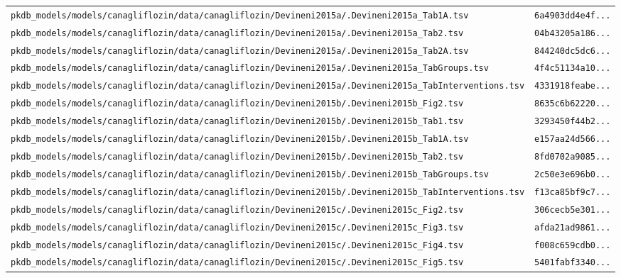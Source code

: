 \documentclass{article}
\begin{document}
\begin{longtable}{ll}
\texttt{pkdb\_models/models/canagliflozin/data/canagliflozin/Devineni2015a/.Devineni2015a\_Tab1A.tsv} & \texttt{6a4903dd4e4f...} \\
\texttt{pkdb\_models/models/canagliflozin/data/canagliflozin/Devineni2015a/.Devineni2015a\_Tab2.tsv} & \texttt{04b43205a186...} \\
\texttt{pkdb\_models/models/canagliflozin/data/canagliflozin/Devineni2015a/.Devineni2015a\_Tab2A.tsv} & \texttt{844240dc5dc6...} \\
\texttt{pkdb\_models/models/canagliflozin/data/canagliflozin/Devineni2015a/.Devineni2015a\_TabGroups.tsv} & \texttt{4f4c51134a10...} \\
\texttt{pkdb\_models/models/canagliflozin/data/canagliflozin/Devineni2015a/.Devineni2015a\_TabInterventions.tsv} & \texttt{4331918feabe...} \\
\texttt{pkdb\_models/models/canagliflozin/data/canagliflozin/Devineni2015b/.Devineni2015b\_Fig2.tsv} & \texttt{8635c6b62220...} \\
\texttt{pkdb\_models/models/canagliflozin/data/canagliflozin/Devineni2015b/.Devineni2015b\_Tab1.tsv} & \texttt{3293450f44b2...} \\
\texttt{pkdb\_models/models/canagliflozin/data/canagliflozin/Devineni2015b/.Devineni2015b\_Tab1A.tsv} & \texttt{e157aa24d566...} \\
\texttt{pkdb\_models/models/canagliflozin/data/canagliflozin/Devineni2015b/.Devineni2015b\_Tab2.tsv} & \texttt{8fd0702a9085...} \\
\texttt{pkdb\_models/models/canagliflozin/data/canagliflozin/Devineni2015b/.Devineni2015b\_TabGroups.tsv} & \texttt{2c50e3e696b0...} \\
\texttt{pkdb\_models/models/canagliflozin/data/canagliflozin/Devineni2015b/.Devineni2015b\_TabInterventions.tsv} & \texttt{f13ca85bf9c7...} \\
\texttt{pkdb\_models/models/canagliflozin/data/canagliflozin/Devineni2015c/.Devineni2015c\_Fig2.tsv} & \texttt{306cecb5e301...} \\
\texttt{pkdb\_models/models/canagliflozin/data/canagliflozin/Devineni2015c/.Devineni2015c\_Fig3.tsv} & \texttt{afda21ad9861...} \\
\texttt{pkdb\_models/models/canagliflozin/data/canagliflozin/Devineni2015c/.Devineni2015c\_Fig4.tsv} & \texttt{f008c659cdb0...} \\
\texttt{pkdb\_models/models/canagliflozin/data/canagliflozin/Devineni2015c/.Devineni2015c\_Fig5.tsv} & \texttt{5401fabf3340...} \\

\end{longtable}
\end{document}

